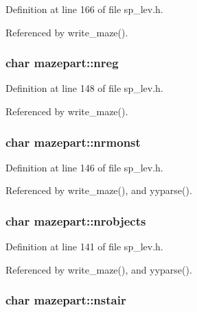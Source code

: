 Definition at line 166 of file sp\+\_\+lev.\+h.



Referenced by write\+\_\+maze().

\hypertarget{structmazepart_a77f61e8de9fd8dd64f136401902dcf80}{
\subsubsection[{nreg}]{\setlength{\rightskip}{0pt plus 5cm}char mazepart\+::nreg}}\label{structmazepart_a77f61e8de9fd8dd64f136401902dcf80}


Definition at line 148 of file sp\+\_\+lev.\+h.



Referenced by write\+\_\+maze().

\hypertarget{structmazepart_aebd2573a96facc64ca1b59eb12e00812}{
\subsubsection[{nrmonst}]{\setlength{\rightskip}{0pt plus 5cm}char mazepart\+::nrmonst}}\label{structmazepart_aebd2573a96facc64ca1b59eb12e00812}


Definition at line 146 of file sp\+\_\+lev.\+h.



Referenced by write\+\_\+maze(), and yyparse().

\hypertarget{structmazepart_a8365c501d22444429933ccf9c24f0d13}{
\subsubsection[{nrobjects}]{\setlength{\rightskip}{0pt plus 5cm}char mazepart\+::nrobjects}}\label{structmazepart_a8365c501d22444429933ccf9c24f0d13}


Definition at line 141 of file sp\+\_\+lev.\+h.



Referenced by write\+\_\+maze(), and yyparse().

\hypertarget{structmazepart_ab55b7bf67af91db70d364ae2b44a2c6e}{
\subsubsection[{nstair}]{\setlength{\rightskip}{0pt plus 5cm}char mazepart\+::nstair}}\label{structmazepart_ab55b7bf67af91db70d364ae2b44a2c6e}



